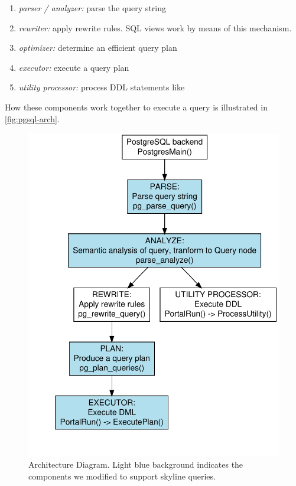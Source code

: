 \begin{enumerate}
\item \emph{parser / analyzer:\/} parse the query string
\item \emph{rewriter:\/} apply rewrite rules. SQL views work by means of this mechanism.
\item \emph{optimizer:\/} determine an efficient query plan
\item \emph{executor:\/} execute a query plan
\item \emph{utility processor:\/} process DDL statements like 
\end{enumerate}

\noindent
How these components work together to execute a query is illustrated
in \autoref{fig:pgsql-arch}.

\begin{figure}[htbp]
\centering
\includegraphics[scale=0.75]{plots-qp/pgsql-arch}
\caption{Architecture Diagram. Light blue background indicates the components we modified to support skyline queries.}%
\label{fig:pgsql-arch}%
\end{figure}

